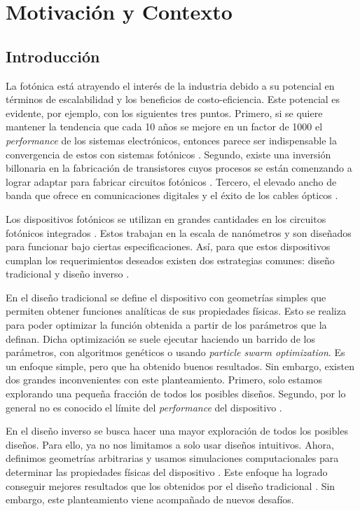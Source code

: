 \chapter{Motivación y Contexto}

\section{Introducción}

La fotónica está atrayendo el interés de la industria debido a su potencial en términos de escalabilidad y los beneficios de costo-eficiencia. 
Este potencial es evidente, por ejemplo, con los siguientes tres puntos. 
Primero, si se quiere mantener la tendencia que cada 10 años se mejore en un factor de 1000 el \emph{performance} de los sistemas electrónicos, entonces parece ser indispensable la convergencia de estos con sistemas fotónicos \citep{Glick2018}. 
Segundo, existe una inversión billonaria en la fabricación de transistores cuyos procesos se están comenzando a lograr adaptar para fabricar circuitos fotónicos \citep{LukasChrostowski2010}.
Tercero, el elevado ancho de banda que ofrece en comunicaciones digitales y el éxito de los cables ópticos \citep{LukasChrostowski2010, Glick2018}.

Los dispositivos fotónicos se utilizan en grandes cantidades en los circuitos fotónicos integrados \citep{LukasChrostowski2010}. 
Estos trabajan en la escala de nanómetros y son diseñados para funcionar bajo ciertas especificaciones. 
Así, para que estos dispositivos cumplan los requerimientos deseados existen dos estrategias comunes: diseño tradicional y diseño inverso \citep{Molesky2018}.


En el diseño tradicional se define el dispositivo con geometrías simples que permiten obtener funciones analíticas de sus propiedades físicas. 
Esto se realiza para poder optimizar la función obtenida a partir de los parámetros que la definan. 
Dicha optimización se suele ejecutar haciendo un barrido de los parámetros, con algoritmos genéticos o usando \emph{particle swarm optimization}. 
Es un enfoque simple, pero que ha obtenido
buenos resultados. Sin embargo, existen dos grandes inconvenientes con este planteamiento. 
Primero, solo estamos explorando una pequeña fracción de todos los posibles diseños.
Segundo, por lo general no es conocido el límite del \emph{performance} del dispositivo \citep{Molesky2018, Su2020}.


En el diseño inverso se busca hacer una mayor exploración de todos los posibles diseños. 
Para ello, ya no nos limitamos a solo usar diseños intuitivos. Ahora, definimos geometrías arbitrarias y usamos simulaciones computacionales para determinar las propiedades físicas del dispositivo \citep{Molesky2018, Su2020}. Este enfoque ha logrado conseguir mejores resultados que los obtenidos por el diseño tradicional \citep{Su2018, Molesky2018}. Sin embargo, este planteamiento viene acompañado de nuevos desafíos.


